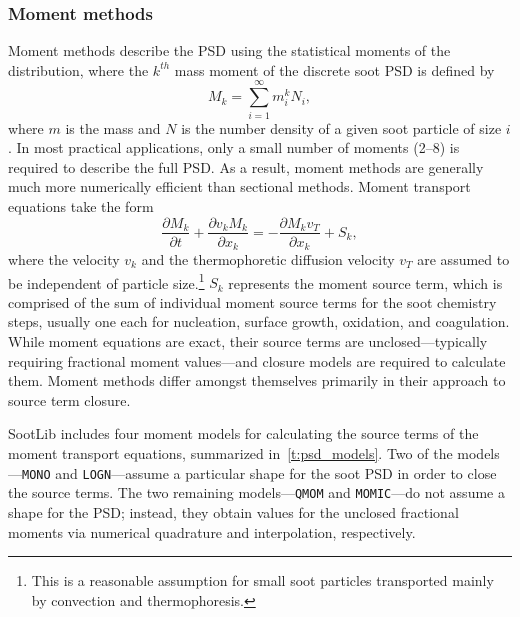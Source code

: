 \documentclass[preprint,letterpaper]{elsarticle}
\begin{document}
\subsubsection{Moment methods}
\label{s:moment-methods}

Moment methods describe the PSD using the statistical moments of the distribution, where the $k^{th}$ mass moment of the discrete soot PSD is defined by
\begin{equation} \label{e:moments}
M_k = \sum_{i=1}^{\infty} m_i^k N_i,
\end{equation}
where $m$ is the mass and $N$ is the number density of a given soot particle of size $i$. In most practical applications, only a small number of moments (2--8) is required to describe the full PSD. As a result, moment methods are generally much more numerically efficient than sectional methods. Moment transport equations take the form
\begin{equation}
    \label{e:momTransEq}
    \frac{\partial M_k}{\partial t} + \frac{\partial v_k M_k}{\partial x_k} = -\frac{\partial M_k v_T}{\partial x_k} + S_k,
\end{equation}
where the velocity $v_k$ and the thermophoretic diffusion velocity $v_T$ are assumed to be independent of particle size.\footnote{This is a reasonable assumption for small soot particles transported mainly by convection and thermophoresis.} $S_k$ represents the moment source term, which is comprised of the sum of individual moment source terms for the soot chemistry steps, usually one each for nucleation, surface growth, oxidation, and coagulation. While moment equations are exact, their source terms are unclosed---typically requiring fractional moment values---and closure models are required to calculate them. Moment methods differ amongst themselves primarily in their approach to source term closure.

SootLib includes four moment models for calculating the source terms of the moment transport equations, summarized in~\ref{t:psd_models}. Two of the models---\texttt{MONO} and \texttt{LOGN}---assume a particular shape for the soot PSD in order to close the source terms. The two remaining models---\texttt{QMOM} and \texttt{MOMIC}---do not assume a shape for the PSD; instead, they obtain values for the unclosed fractional moments via numerical quadrature and interpolation, respectively.
\end{document}
